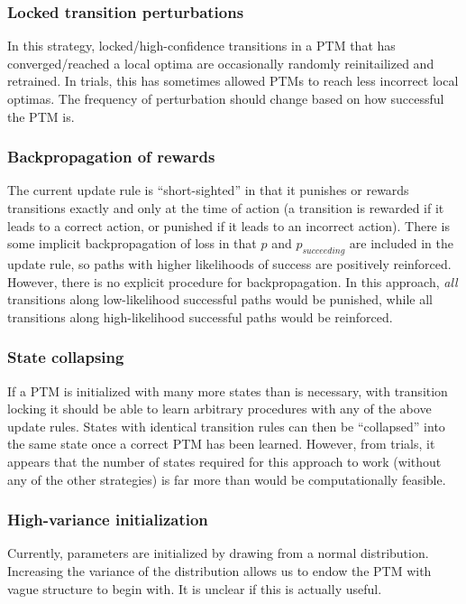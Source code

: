 \documentclass{article}
\begin{document}
\subsubsection{Locked transition perturbations}
In this strategy, locked/high-confidence transitions in a PTM that has converged/reached a local optima are occasionally randomly reinitailized and retrained. In trials, this has sometimes allowed PTMs to reach less incorrect local optimas. The frequency of perturbation should change based on how successful the PTM is.

\subsubsection{Backpropagation of rewards}
The current update rule is ``short-sighted'' in that it punishes or rewards transitions exactly and only at the time of action (a transition is rewarded if it leads to a correct action, or punished if it leads to an incorrect action). There is some implicit backpropagation of loss in that $p$ and $p_{succeeding}$ are included in the update rule, so paths with higher likelihoods of success are positively reinforced. However, there is no explicit procedure for backpropagation. In this approach, \textit{all} transitions along low-likelihood successful paths would be punished, while all transitions along high-likelihood successful paths would be reinforced.

\subsubsection{State collapsing}
If a PTM is initialized with many more states than is necessary, with transition locking it should be able to learn arbitrary procedures with any of the above update rules. States with identical transition rules can then be ``collapsed'' into the same state once a correct PTM has been learned. However, from trials, it appears that the number of states required for this approach to work (without any of the other strategies) is far more than would be computationally feasible. 

\subsubsection{High-variance initialization}
Currently, parameters are initialized by drawing from a normal distribution. Increasing the variance of the distribution allows us to endow the PTM with vague structure to begin with. It is unclear if this is actually useful. 
\end{document}
